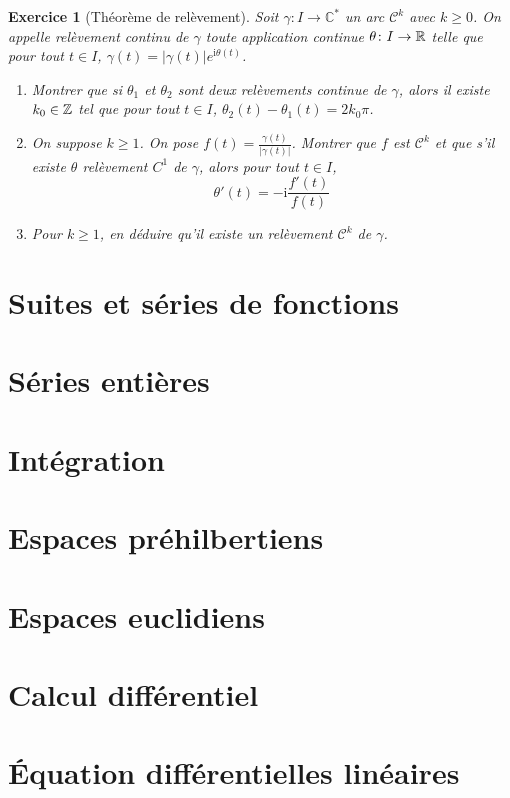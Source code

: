 \documentclass[12pt]{article}
\newtheorem{exercise}{Exercice}[section]
\theoremstyle{remark}
\theoremstyle{remark}
\newcommand{\C}{\mathbb{C}} \newcommand{\Q}{\mathbb{Q}}
\begin{document}
\begin{exercise}[Théorème de relèvement]
	Soit $\gamma\colon I\to\C^{*}$ un arc $\mathcal{C}^{k}$ avec $k\geqslant0$. On appelle relèvement continu de $\gamma$ toute application continue $\theta\colon I\to\mathbb{R}$ telle que pour tout $t\in I$, $\gamma(t)=\vert\gamma(t)\vert e^{\mathrm{i}\theta(t)}$.
	\begin{enumerate}
		\item Montrer que si $\theta_{1}$ et $\theta_{2}$ sont deux relèvements continue de $\gamma$, alors il existe $k_{0}\in\mathbb{Z}$ tel que pour tout $t\in I$, $\theta_{2}(t)-\theta_{1}(t)=2k_{0}\pi$.
		\item On suppose $k\geqslant1$. On pose $f(t)=\frac{\gamma(t)}{\vert\gamma(t)\vert}$. Montrer que $f$ est $\mathcal{C}^{k}$ et que s'il existe $\theta$ relèvement $C^{1}$ de $\gamma$, alors pour tout $t\in I$, 
		$$\theta'(t)=-\mathrm{i}\frac{f'(t)}{f(t)}$$
		\item Pour $k\geqslant1$, en déduire qu'il existe un relèvement $\mathcal{C}^{k}$ de $\gamma$.
	\end{enumerate}
\end{exercise}

\section{Suites et séries de fonctions}
\section{Séries entières}
\section{Intégration}
\section{Espaces préhilbertiens}
\section{Espaces euclidiens}
\section{Calcul différentiel}
\section{\'Equation différentielles linéaires}
\end{document}
